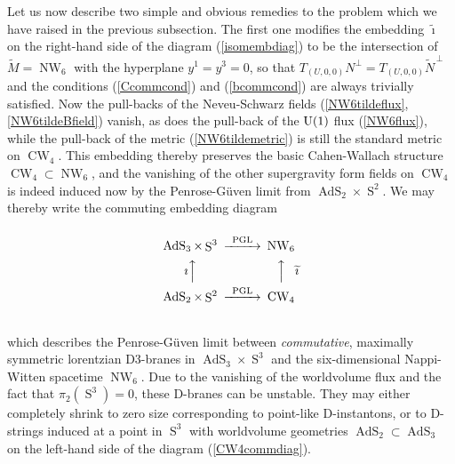 \documentclass[11pt,a4paper]{article}
\DeclareMathOperator{\AdS}{AdS}
\DeclareMathOperator{\Sphere}{S}
\DeclareMathOperator{\NW}{NW}
\DeclareMathOperator{\CW}{CW}
\let\S\Sphere
\begin{document}
Let us now describe two simple and obvious remedies to the problem
which we have raised in the previous subsection. The first one modifies the
embedding $\widetilde{\imath}$ on the right-hand side of the diagram
(\ref{isomembdiag}) to be the intersection of $\widetilde{M}=\NW_6$
with the hyperplane $y^1=y^3=0$, so that
 $T_{(U,0,0)}N^\perp=T_{(U,0,0)}\widetilde{N}^{\,\perp}$ and the
conditions (\ref{Ccommcond}) and (\ref{bcommcond}) are always
trivially satisfied. Now the pull-backs of the Neveu-Schwarz fields
(\ref{NW6tildeflux},\ref{NW6tildeBfield}) vanish, as does the
pull-back of the ${\rm U}(1)$ flux (\ref{NW6flux}), while the pull-back
of the metric (\ref{NW6tildemetric}) is still the standard metric on
$\CW_4$. This embedding thereby preserves the basic Cahen-Wallach
structure $\CW_4\subset\NW_6$, and the vanishing of the other
supergravity form fields on $\CW_4$ is indeed induced now by the
Penrose-G\"uven limit from $\AdS_2\times\S^2$. We may thereby write
the commuting embedding diagram
\begin{equation}
  \label{CW4commdiag}
  \begin{CD}
    @.\\
    \AdS_3 \times \S^3             @>\text{PGL}>> \NW_6\\
    \text{$\imath$}@AAA @AAA\text{$\widetilde{\imath}$}\\
    \AdS_2 \times \S^2             @>\text{PGL}>> \CW_4\\
    @.
  \end{CD}
\end{equation}
which describes the Penrose-G\"uven limit between {\it commutative},
maximally symmetric lorentzian D3-branes in $\AdS_3\times\S^3$ and the
six-dimensional Nappi-Witten spacetime $\NW_6$. Due to the vanishing
of the worldvolume flux and the fact that $\pi_2(\S^3)=0$, these
D-branes can be unstable. They may either completely shrink to zero
size corresponding to point-like D-instantons, or to D-strings induced
at a point in $\S^3$ with worldvolume geometries
$\AdS_2\subset\AdS_3$ on the left-hand side of the diagram
(\ref{CW4commdiag}).
\end{document}
